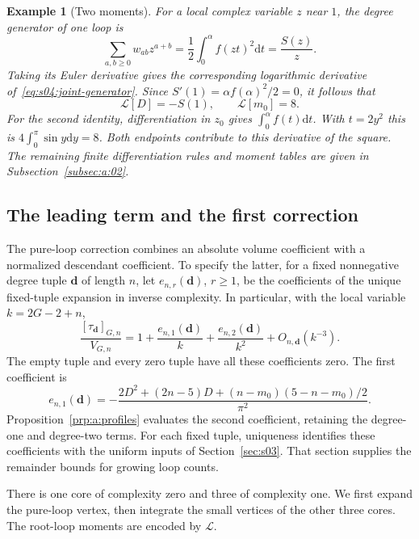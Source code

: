 \documentclass[a4paper,10pt]{article}
\numberwithin{equation}{section}
\newcommand{\dd}{\mathrm{d}}
\theoremstyle{paperplain}
\theoremstyle{paperremark}
\newtheorem{exm}{Example}[section]
\theoremstyle{paperplain}
\begin{document}
\begin{exm}[Two moments]
For a local complex variable $z$ near $1$, the degree generator of
one loop is
\[
 \sum_{a,b\geq0}w_{ab}z^{a+b}
 =\frac12\int_0^\alpha f(zt)^2\dd t=\frac{S(z)}z.
\]
Taking its Euler derivative gives the corresponding logarithmic
derivative of~\eqref{eq:s04:joint-generator}. Since
$S'(1)=\alpha f(\alpha)^2/2=0$, it follows that
\begin{equation}\label{eq:s04:representative-moments}
 \mathcal L[D]=-S(1),\qquad \mathcal L[m_0]=8.
\end{equation}
For the second identity, differentiation in $z_0$ gives
$\int_0^\alpha f(t)\dd t$. With $t=2y^2$ this is
$4\int_0^\pi\sin y\dd y=8$. Both endpoints contribute to this
derivative of the square. The remaining finite differentiation rules
and moment tables are given in Subsection~\ref{subsec:a:02}.
\end{exm}

\subsection{The leading term and the first correction}
\label{subsec:s04:02}

The pure-loop correction combines an absolute volume coefficient with
a normalized descendant coefficient. To specify the latter, for a
fixed nonnegative degree tuple $\mathbf d$ of length $n$, let
$e_{n,r}(\mathbf d)$, $r\geq1$, be the coefficients of the unique
fixed-tuple expansion in inverse complexity. In particular, with the
local variable $k=2G-2+n$,
\begin{equation}\label{eq:s04:profile-coefficients}
 \frac{[\tau_{\mathbf d}]_{G,n}}{V_{G,n}}
 =1+\frac{e_{n,1}(\mathbf d)}k
     +\frac{e_{n,2}(\mathbf d)}{k^2}+O_{n,\mathbf d}(k^{-3}).
\end{equation}
The empty tuple and every zero tuple have all these coefficients zero.
The first coefficient is
\begin{equation}\label{eq:s04:first-profile}
 e_{n,1}(\mathbf d)
 =-\frac{2D^2+(2n-5)D+(n-m_0)(5-n-m_0)/2}{\pi^2}.
\end{equation}
Proposition~\ref{prp:a:profiles} evaluates the second coefficient,
retaining the degree-one and degree-two terms. For each fixed tuple,
uniqueness identifies these coefficients with the uniform inputs of
Section~\ref{sec:s03}. That section supplies the remainder bounds
for growing loop counts.

There is one core of complexity zero and three of complexity one.
We first expand the pure-loop vertex, then integrate the small vertices
of the other three cores. The root-loop moments are encoded by
$\mathcal L$.
\end{document}
